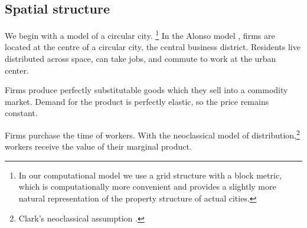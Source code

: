 \subsection{Spatial structure}

%  

We begin with a model of a circular city. \footnote{In our computational model we use a grid structure with  a block metric, which is computationally more convenient and provides a slightly more natural representation of the property structure of actual cities.} %
In the \gls{Alonso model} \cite{alonsoTheoryUrbanLand1960, alonsoLocationLandUse1964}, firms are located at the centre of a circular city, the central business district. Residents live distributed across space, can take jobs, and commute to work at the urban center. 

Firms produce perfectly \gls{substitutable} %
goods which they sell into a commodity market. Demand for the \gls{product} is \gls{perfectly elastic}, so the price remains constant. 

Firms purchase the time of workers. %
With the neoclassical model of distribution,\footnote{Clark's neoclassical assumption \cite{clarkDistributionWealthTheory1899}.} 
workers receive the value of their marginal product. 

 
